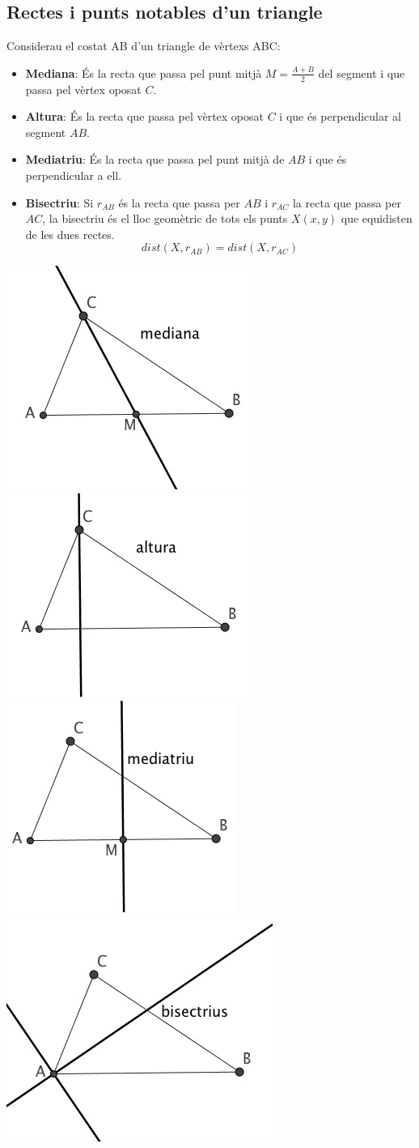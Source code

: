 \subsection{Rectes i punts notables d'un triangle}

\begin{theorybox}
	
	Considerau el costat AB d'un triangle de vèrtexs ABC:
	
	\begin{itemize}
		\item \textbf{Mediana}: És la recta que passa pel punt mitjà $M=\frac{A+B}{2}$ del segment i que passa pel vèrtex oposat $C$.
		
		\item \textbf{Altura}: És la recta que passa pel vèrtex oposat $C$ i que és perpendicular al segment $AB$.
		
		\item \textbf{Mediatriu}: És la recta que passa pel punt mitjà de $AB$ i que és perpendicular a ell.
		
		\item \textbf{Bisectriu}: Si $r_{AB}$ és la recta que passa per $AB$ i $r_{AC}$ la recta que passa per $AC$, la bisectriu és el lloc geomètric de tots els punts $X(x,y)$ que equidisten de les dues rectes.
		\begin{equation*}
		dist(X,r_{AB}) = dist(X,r_{AC})
		\end{equation*}
	\end{itemize}
	
	
	\begin{center}
		
		\includegraphics[height=3.cm]{img-09/mediana.png}
		\includegraphics[height=3.cm]{img-09/altura.png}
		\includegraphics[height=3.cm]{img-09/mediatriu.png}
		\includegraphics[height=3.cm]{img-09/bisectriu.png}
		

\end{center}
\end{theorybox}
